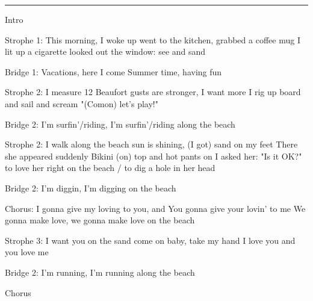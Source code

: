 \noindent\rule{\columnwidth}{1pt}

\begin{lstsong}
Intro

Strophe 1:
This morning, I woke up
went to the kitchen, grabbed a coffee mug
I lit up a cigarette
looked out the window: see and sand

Bridge 1:
Vacations, here I come
Summer time, having fun

Strophe 2:
I measure 12 Beaufort
gusts are stronger, I want more
I rig up board and sail
and scream "(Comon) let's play!"

Bridge 2:
I'm surfin'/riding, I'm surfin'/riding along the beach

Strophe 2:
I walk along the beach
sun is shining, (I got) sand on my feet
There she appeared suddenly
Bikini (on) top and hot pants on
I asked her: "Is it OK?"
to love her right on the beach / to dig a hole in her head

Bridge 2:
I'm diggin, I'm digging on the beach

Chorus:
I gonna give my loving to you, and
You gonna give your lovin' to me
We gonna make love, we gonna make love
on the beach

Strophe 3:
I want you on the sand
come on baby, take my hand
I love you and 
you love me

Bridge 2:
I'm running, I'm running along the beach

Chorus
\end{lstsong}
\newpage

